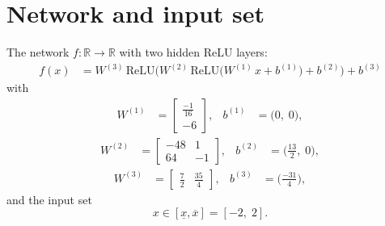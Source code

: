 \documentclass[11pt]{article}
\begin{document}
\section{Network and input set}
The network $f:\mathbb{R} \to \mathbb{R}$ with two hidden ReLU layers:
\begin{align*}
f(x) &= W^{(3)}\,\mathrm{ReLU}\bigl(W^{(2)}\,\mathrm{ReLU}\bigl(W^{(1)}\,x + b^{(1)}\bigr) + b^{(2)}\bigr) + b^{(3)}
\end{align*}
with
\begin{align*}
W^{(1)} &= \begin{bmatrix}
\frac{-1}{16} \\
-6
\end{bmatrix}, & b^{(1)} &= \bigl(0,\; 0\bigr),
\end{align*}
\begin{align*}
W^{(2)} &= \begin{bmatrix}
-48 & 1 \\
64 & -1
\end{bmatrix}, & b^{(2)} &= \bigl(\frac{13}{2},\; 0\bigr),
\end{align*}
\begin{align*}
W^{(3)} &= \begin{bmatrix}
\frac{7}{2} & \frac{35}{4}
\end{bmatrix}, & b^{(3)} &= \bigl(\frac{-31}{4}\bigr),
\end{align*}
and the input set
\begin{equation*}
 x \in [\underline{x}, \overline{x}] = [-2,\; 2].
\end{equation*}
\end{document}
